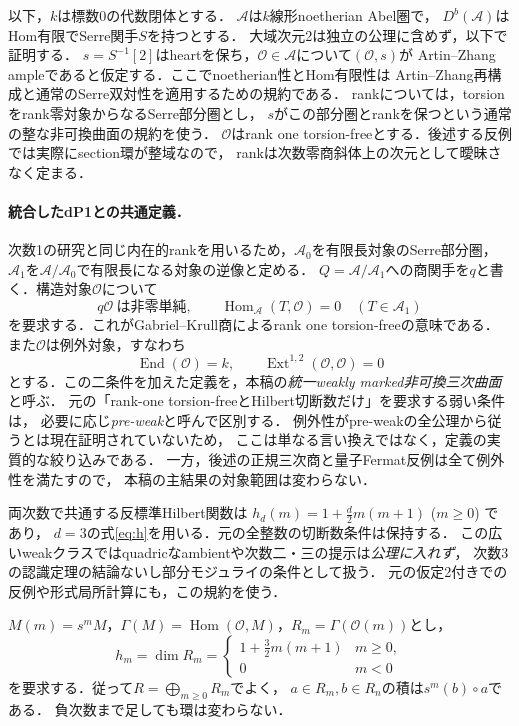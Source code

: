 \documentclass[11pt,a4paper]{ltjsarticle}
\theoremstyle{definition}\newtheorem{definition}[theorem]{定義}
\newcommand{\OO}{\mathcal O}\newcommand{\cA}{\mathcal A}
\newcommand{\End}{\operatorname{End}}\newcommand{\Hom}{\operatorname{Hom}}\newcommand{\Ext}{\operatorname{Ext}}
\begin{document}
以下，$k$は標数0の代数閉体とする．
$\cA$は$k$線形noetherian Abel圏で，
$D^b(\cA)$はHom有限でSerre関手$S$を持つとする．
大域次元2は独立の公理に含めず，以下で証明する．
$s=S^{-1}[2]$はheartを保ち，$\OO\in\cA$について$(\OO,s)$が
Artin--Zhang ampleであると仮定する．ここでnoetherian性とHom有限性は
Artin--Zhang再構成と通常のSerre双対性を適用するための規約である．
rankについては，torsionをrank零対象からなるSerre部分圏とし，
$s$がこの部分圏とrankを保つという通常の整な非可換曲面の規約を使う．
$\OO$はrank one torsion-freeとする．後述する反例では実際にsection環が整域なので，
rankは次数零商斜体上の次元として曖昧さなく定まる．

\paragraph{統合したdP1との共通定義．}
\label{par:unified-dp}
次数1の研究と同じ内在的rankを用いるため，$\cA_0$を有限長対象のSerre部分圏，
$\cA_1$を$\cA/\cA_0$で有限長になる対象の逆像と定める．
$Q=\cA/\cA_1$への商関手を$q$と書く．構造対象$\OO$について
\begin{equation}\label{eq:unified-rank}
 q\OO\ \text{は非零単純},\qquad
 \Hom_{\cA}(T,\OO)=0\quad(T\in\cA_1)
\end{equation}
を要求する．これがGabriel--Krull商によるrank one torsion-freeの意味である．
また$\OO$は例外対象，すなわち
\begin{equation}\label{eq:unified-exceptional}
 \End(\OO)=k,\qquad \Ext^{1,2}(\OO,\OO)=0
\end{equation}
とする．この二条件を加えた定義を，本稿の\emph{統一weakly marked非可換三次曲面}と呼ぶ．
元の「rank-one torsion-freeとHilbert切断数だけ」を要求する弱い条件は，
必要に応じ\emph{pre-weak}と呼んで区別する．
例外性がpre-weakの全公理から従うとは現在証明されていないため，
ここは単なる言い換えではなく，定義の実質的な絞り込みである．
一方，後述の正規三次商と量子Fermat反例は全て例外性を満たすので，
本稿の主結果の対象範囲は変わらない．

両次数で共通する反標準Hilbert関数は
$h_{d}(m)=1+\frac d2m(m+1)$ ($m\ge0$) であり，
$d=3$の式\eqref{eq:h}を用いる．元の全整数の切断数条件は保持する．
この広いweakクラスではquadricなambientや次数二・三の提示は\emph{公理に入れず}，
次数3の認識定理の結論ないし部分モジュライの条件として扱う．
元の仮定2付きでの反例や形式局所計算にも，この規約を使う．

$M(m)=s^mM$，$\Gamma(M)=\Hom(\OO,M)$，$R_m=\Gamma(\OO(m))$とし，
\begin{equation}\label{eq:h}
 h_m=\dim R_m=
 \begin{cases}1+\frac32m(m+1)&m\ge0,\\0&m<0\end{cases}
\end{equation}
を要求する．従って$R=\bigoplus_{m\ge0}R_m$でよく，
$a\in R_m,b\in R_n$の積は$s^m(b)\circ a$である．
負次数まで足しても環は変わらない．
\end{document}
